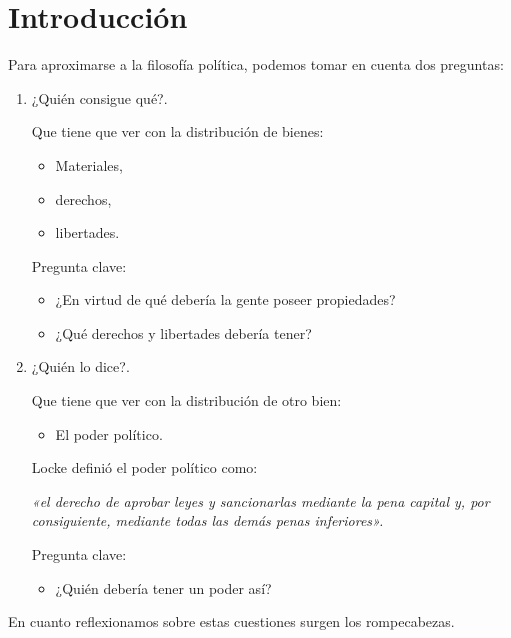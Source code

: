 \chapter*{Introducción}

Para aproximarse a la filosofía política, podemos tomar en cuenta dos preguntas:

\begin{enumerate}[\bfseries 1.]

    \item ¿Quién consigue qué?.

	Que tiene que ver con la distribución de bienes:
	\begin{itemize}
	    \item Materiales,
	    \item derechos,
	    \item libertades.
	\end{itemize}

	{\color{blue}
	Pregunta clave:
	\begin{itemize}
	    \item ¿En virtud de qué debería la gente poseer propiedades?
	    \item ¿Qué derechos y libertades debería tener?
	\end{itemize}
	}


    \item ¿Quién lo dice?.

	Que tiene que ver con la distribución de otro bien:
	\begin{itemize}
	    \item El poder político.
	\end{itemize}

	Locke definió el poder político como:
	\begin{center}
	    \textit{«el derecho de aprobar leyes y sancionarlas mediante la pena capital y, por consiguiente, mediante todas las demás penas inferiores».}
	\end{center}

	{\color{blue}
	Pregunta clave:
	\begin{itemize}
	    \item ¿Quién debería tener un poder así?
	\end{itemize}
	}

\end{enumerate}

En cuanto reflexionamos sobre estas cuestiones surgen los rompecabezas.

